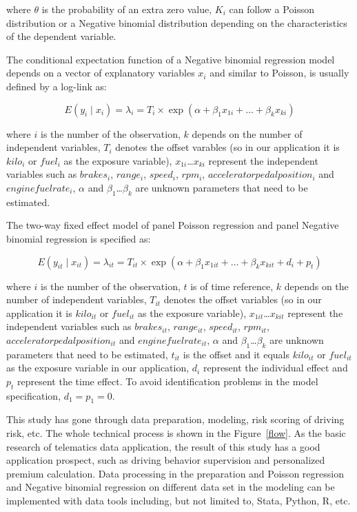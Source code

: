 \documentclass[entropy,article,submit,moreauthors,LaTeX and dvi2pdf]{Definitions/mdpi}
\begin{document}
\begin{paracol}{2}
where $\theta$ is the probability of an extra zero value, $K_i$ can follow a Poisson distribution or a Negative binomial distribution depending on the characteristics of the dependent variable.

The conditional expectation function of a Negative binomial regression model depends on a vector of explanatory variables $x_i$ and similar to Poisson, is usually defined by a log-link as:

\begin{equation}
E(y_{i}\mid x_{i} ) =\lambda _{i}= T_{i} \times \exp (\alpha +\beta_{1}x_{1i} +\dots +\beta_{k}x_{ki})
\end{equation}

where $i$ is the number of the observation, $k$ depends on the number of independent variables, $T_{i}$ denotes the offset varables (so in our application it is $kilo_i$ or $fuel_i$ as the exposure variable), $x_{1i}$\dots $x_{ki}$ represent the independent variables such as $brakes_i$, $range_i$, $speed_i$, $rpm_i$, $acceleratorpedalposition_i$ and $enginefuelrate_i$, $\alpha$ and $\beta _{1}$\dots $\beta _{k}$ are unknown parameters that need to be estimated.

The two-way fixed effect model of panel Poisson regression and panel Negative binomial regression is specified as:

\begin{equation}
E(y_{it}\mid x_{it} ) =\lambda _{it}= T_{it} \times \exp (\alpha +\beta_{1}x_{1it} +\dots +\beta_{k}x_{kit}+d_{i}+p_{t})
\end{equation}

where $i$ is the number of the observation, $t$ is of time reference, $k$ depends on the number of independent variables, $T_{it}$ denotes the offset variables (so in our application it is $kilo_{it}$ or $fuel_{it}$ as the exposure variable), $x_{1it}$\dots $x_{kit}$ represent the independent variables such as $brakes_{it}$, $range_{it}$, $speed_{it}$, $rpm_{it}$, $acceleratorpedalposition_{it}$ and $enginefuelrate_{it}$, $\alpha$ and $\beta _{1}$\dots $\beta _{k}$ are unknown parameters that need to be estimated, $t_{it}$ is the offset and it equals $kilo_{it}$ or $fuel_{it}$ as the exposure variable in our application, $d_i$ represent the individual effect and $p_t$ represent the time effect. To avoid identification problems in the model specification, $d_1=p_1=0$.

This study has gone through data preparation, modeling, risk scoring of driving risk, etc. The whole technical process is shown in the Figure~\ref{flow}. As the basic research of telematics data application, the result of this study has a good application prospect, such as driving behavior supervision and personalized premium calculation. Data processing in the preparation and Poisson regression and Negative binomial regression on different data set in the modeling can be implemented with data tools including, but not limited to, Stata, Python, R, etc.
\end{paracol}
\end{document}
